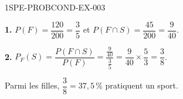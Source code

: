 \begin{corrige}{1SPE-PROBCOND-EX-003}

\textbf{1.} $P(F) = \dfrac{120}{200} = \dfrac{3}{5}$ et $P(F \cap S) = \dfrac{45}{200} = \dfrac{9}{40}$.

\medskip
\textbf{2.} $P_F(S) = \dfrac{P(F \cap S)}{P(F)} = \dfrac{\frac{9}{40}}{\frac{3}{5}} = \dfrac{9}{40} \times \dfrac{5}{3} = \dfrac{3}{8}$.

Parmi les filles, $\dfrac{3}{8} = 37{,}5\,\%$ pratiquent un sport.

\end{corrige}
